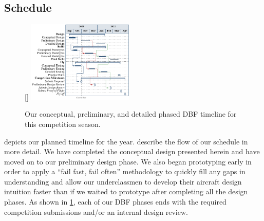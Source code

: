 \subsection{Schedule}
\label{ssec:Schedule}
\begin{figure}
		\raisebox{0pt}[\dimexpr{}\baselineskip\relax]{
	\includegraphics[width=0.45\textwidth]{ganttchart.pdf}}
	\caption{Our {\color{\BYUblue} conceptual}, {\color{\BYUred} preliminary}, and {\color{\BYUgreen} detailed} phased DBF timeline for this competition season.}
	\label{fig:plannedtiming}
\end{figure} 
 depicts our planned timeline for the year.  describe the flow of our schedule in more detail. We have completed the conceptual design presented herein and have moved on to our preliminary design phase. We also began prototyping early in order to apply a ``fail fast, fail often'' methodology to quickly fill any gaps in understanding and allow our underclassmen to develop their aircraft design intuition faster than if we waited to prototype after completing all the design phases. As shown in \cref{fig:plannedtiming}, each of our DBF phases ends with the required competition submissions and/or an internal design review.

